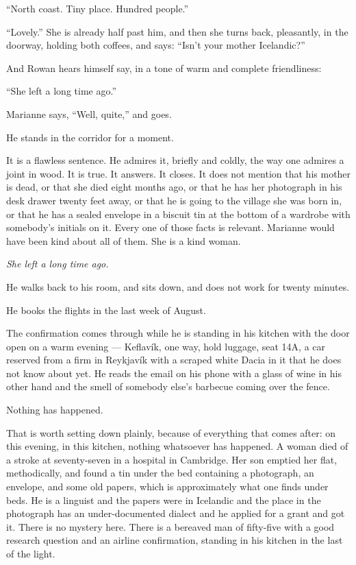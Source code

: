 \documentclass[11pt,oneside]{book}
\newcommand{\sceneline}{%
  \par\vspace{1.2em}
  \begin{center}
    \fontsize{11}{11}\selectfont \textbullet\quad\textbullet\quad\textbullet
  \end{center}
  \vspace{0.6em}\noindent\ignorespaces
}
\begin{document}
``North coast. Tiny place. Hundred people.''

``Lovely.'' She is already half past him, and then she turns back,
pleasantly, in the doorway, holding both coffees, and says: ``Isn't your
mother Icelandic?''

And Rowan hears himself say, in a tone of warm and complete
friendliness:

``She left a long time ago.''

Marianne says, ``Well, quite,'' and goes.

He stands in the corridor for a moment.

It is a flawless sentence. He admires it, briefly and coldly, the way one
admires a joint in wood. It is true. It answers. It closes. It does not
mention that his mother is dead, or that she died eight months ago, or
that he has her photograph in his desk drawer twenty feet away, or that
he is going to the village she was born in, or that he has a sealed
envelope in a biscuit tin at the bottom of a wardrobe with somebody's
initials on it. Every one of those facts is relevant. Marianne would
have been kind about all of them. She is a kind woman.

\emph{She left a long time ago.}

He walks back to his room, and sits down, and does not work for
twenty minutes.

\sceneline

He books the flights in the last week of August.

The confirmation comes through while he is standing in his kitchen with
the door open on a warm evening --- Keflavík, one way, hold luggage,
seat 14A, a car reserved from a firm in Reykjavík with a scraped white
Dacia in it that he does not know about yet. He reads the email on his
phone with a glass of wine in his other hand and the smell of somebody
else's barbecue coming over the fence.

Nothing has happened.

That is worth setting down plainly, because of everything that comes
after: on this evening, in this kitchen, nothing whatsoever has happened.
A woman died of a stroke at seventy-seven in a hospital in Cambridge.
Her son emptied her flat, methodically, and found a tin under the bed
containing a photograph, an envelope, and some old papers, which is
approximately what one finds under beds. He is a linguist and the
papers were in Icelandic and the place in the photograph has an
under-documented dialect and he applied for a grant and got it. There
is no mystery here. There is a bereaved man of fifty-five with a good
research question and an airline confirmation, standing in his kitchen
in the last of the light.
\end{document}
